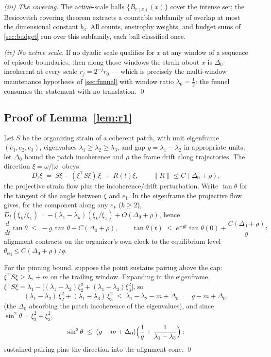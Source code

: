 \documentclass[11pt,letterpaper]{amsart}
\theoremstyle{definition}
\theoremstyle{remark}
\newcommand{\om}{\omega}
\newcommand{\norm}[1]{\lVert #1 \rVert}
\newcommand{\abs}[1]{\lvert #1 \rvert}
\begin{document}
\emph{(iii) The covering.} The active-scale balls $\{B_{r(x)}(x)\}$ cover the intense
set; the Besicovitch covering theorem \cite{Mattila1995} extracts a countable
subfamily of overlap at most the dimensional constant $b_3$. All counts,
enstrophy weights, and budget sums of \cref{sec:budget} run over this subfamily, each
ball classified once.

\emph{(iv) No active scale.} If no dyadic scale qualifies for $x$ at any window of a
sequence of episode boundaries, then along those windows the strain about $x$ is
$\Delta_0$-incoherent at every scale $r_j=2^{-j}r_0$ --- which is precisely the
multi-window maintenance hypothesis of \cref{sec:funnel} with window ratio
$\lambda_0=\tfrac12$: the funnel consumes the statement with no translation. \qed

\subsection{Proof of Lemma~\ref{lem:r1}}\label{pf:r1}
Let $S$ be the organizing strain of a coherent patch, with unit eigenframe
$(e_1,e_2,e_3)$, eigenvalues $\lambda_1\ge\lambda_2\ge\lambda_3$, and gap
$g=\lambda_1-\lambda_2$ in appropriate units; let $\Delta_0$ bound the patch
incoherence and $\rho$ the frame drift along trajectories. The direction
$\xi=\om/\abs{\om}$ obeys
\[
D_t\xi\;=\;S\xi-(\xi^{\top}S\xi)\,\xi\;+\;R(t)\xi,
\qquad \norm{R}\le C(\Delta_0+\rho),
\]
the projective strain flow plus the incoherence/drift perturbation. Write
$\tan\theta$ for the tangent of the angle between $\xi$ and $e_1$. In the eigenframe
the projective flow gives, for the component along any $e_k$ ($k\ge2$),
$D_t(\xi_k/\xi_1)=-(\lambda_1-\lambda_k)(\xi_k/\xi_1)+O(\Delta_0+\rho)$, hence
\[
\frac{d}{dt}\tan\theta\;\le\;-g\,\tan\theta+C(\Delta_0+\rho),
\qquad
\tan\theta(t)\;\le\;e^{-gt}\tan\theta(0)+\frac{C(\Delta_0+\rho)}{g}:
\]
alignment contracts on the organizer's own clock to the equilibrium level
$\theta_{\mathrm{eq}}\le C(\Delta_0+\rho)/g$.

For the pinning bound, suppose the point sustains pairing above the cap:
$\xi^{\top}S\xi\ge\lambda_2+m$ on the trailing window. Expanding in the eigenframe,
$\xi^{\top}S\xi=\lambda_1-\bigl[(\lambda_1-\lambda_2)\xi_2^2
+(\lambda_1-\lambda_3)\xi_3^2\bigr]$, so
\[
(\lambda_1-\lambda_2)\,\xi_2^2+(\lambda_1-\lambda_3)\,\xi_3^2
\;\le\;\lambda_1-\lambda_2-m+\Delta_0\;=\;g-m+\Delta_0 ,
\]
(the $\Delta_0$ absorbing the patch incoherence of the eigenvalues), and since
$\sin^2\theta=\xi_2^2+\xi_3^2$,
\[
\sin^2\theta\;\le\;(g-m+\Delta_0)\Bigl(\frac1g+\frac{1}{\lambda_1-\lambda_3}\Bigr):
\]
sustained pairing pins the direction into the alignment cone. \qed
\end{document}
